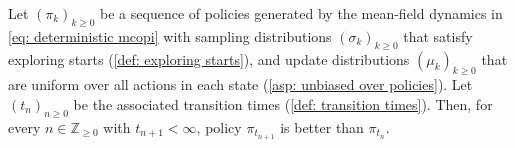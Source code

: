 \begin{proposition}
\label{thm: unbiased mces policy improves}
Let \((\pi_k)_{k\ge 0}\) be a sequence of policies generated by the mean-field dynamics in \eqref{eq: deterministic mcopi}
with
sampling distributions $(\sigma_k)_{k \ge 0}$ that satisfy exploring starts (\autoref{def: exploring starts}),
and update distributions $(\mu_k)_{k \ge 0}$ that are uniform over all actions in each state (\autoref{asp: unbiased over policies}).
Let \((t_n)_{n\ge 0}\) be the associated transition times (\autoref{def: transition times}).
Then, for every \(n \in \mathbb Z_{\ge 0}\) with \(t_{n+1}<\infty\), policy
\(\pi_{t_{n+1}}\) is better than \(\pi_{t_n}\).



\end{proposition}
\vspace{-0.6cm}
